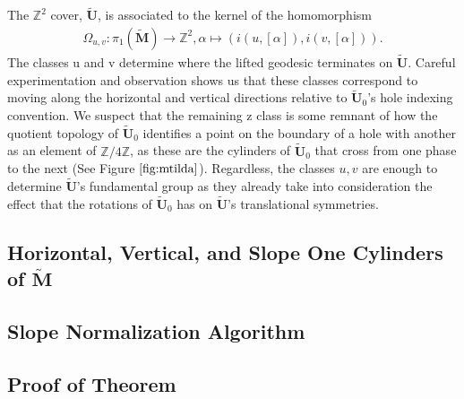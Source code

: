 \documentclass[]{article}
\begin{document}
The $\mathbb{Z}^2$ cover, $\tilde{\mathbf{U}}$, is associated to the kernel of the homomorphism
\begin{align}
\Omega_{u,v}:\pi_1(\tilde{\mathbf{M}})\rightarrow \mathbb{Z}^2, \alpha\mapsto(i(u,[\alpha]),i(v,[\alpha])).
\end{align}
The classes u and v determine where the lifted geodesic terminates on $\tilde{\mathbf{U}}$. Careful experimentation and observation shows us that these classes correspond to moving along the horizontal and vertical directions relative to $\tilde{\mathbf{U}}_0$'s hole indexing convention. We suspect that the remaining z class is some remnant of how the quotient topology of $\tilde{\mathbf{U}}_0$ identifies a point on the boundary of a hole with another as an element of $\mathbb{Z}/4\mathbb Z$, as these are the cylinders of $\tilde{\mathbf{U}}_0$ that cross from one phase to the next (See Figure $\ref{fig:mtilda}$). Regardless, the classes $u,v$ are enough to determine $\tilde{\mathbf{U}}$'s fundamental group as they already take into consideration the effect that the rotations of $\tilde{\mathbf{U}}_0$ has on $\tilde{\mathbf{U}}$'s translational symmetries.
\newpage
\subsection{Horizontal, Vertical, and Slope One Cylinders of $\tilde{\mathbf{M}}$}
\begin{figure}[H]
\centering

\end{figure}
\newpage
\subsection{Slope Normalization Algorithm}
\newpage
\subsection{Proof of Theorem}
\end{document}
